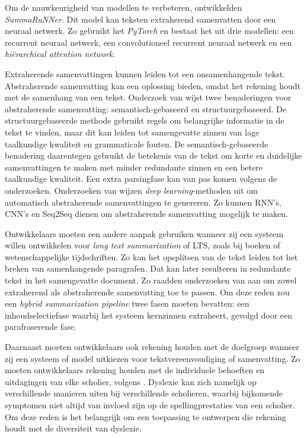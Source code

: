 \medspace

Om de nauwkeurigheid van modellen te verbeteren, ontwikkelden \textcite{Nallapati2017} \textit{SummaRuNNer}. Dit model kan teksten extraherend samenvatten door een neuraal netwerk. Zo gebruikt het \textit{PyTorch} en bestaat het uit drie modellen: een recurrent neuraal netwerk, een convolutioneel recurrent neuraal netwerk en een \textit{hiërarchical attention network}.

\medspace

Extraherende samenvattingen kunnen leiden tot een onsamenhangende tekst. Abstraherende samenvatting kan een oplossing bieden, omdat het rekening houdt met de samenhang van een tekst. Onderzoek van \textcite{Gupta2019} wijst twee benaderingen voor abstraherende samenvatting: semantisch-gebaseerd en structuurgebaseerd. De structuurgebaseerde methode gebruikt regels om belangrijke informatie in de tekst te vinden, maar dit kan leiden tot samengevatte zinnen van lage taalkundige kwaliteit en grammaticale fouten. De semantisch-gebaseerde benadering daarentegen gebruikt de betekenis van de tekst om korte en duidelijke samenvattingen te maken met minder redundante zinnen en een betere taalkundige kwaliteit. Een extra parsingfase kan van pas komen volgens de onderzoeken. Onderzoeken van \textcite{Suleiman2020, Cao2022} wijzen \textit{deep learning}-methoden uit om automatisch abstraherende samenvattingen te genereren. Zo kunnen RNN's, CNN's en Seq2Seq dienen om abstraherende samenvatting mogelijk te maken. 

\medspace

Ontwikkelaars moeten een andere aanpak gebruiken wanneer zij een systeem willen ontwikkelen voor \textit{long text summarization} of LTS, zoals bij boeken of wetenschappelijke tijdschriften. Zo kan het opsplitsen van de tekst leiden tot het breken van samenhangende paragrafen. Dat kan later resulteren in redundante tekst in het samengevatte document. Zo raadden onderzoeken van \textcite{Hsu2018, Huang2019} aan om zowel extraherend als abstraherende samenvatting toe te passen. Om deze reden zou een \textit{hybrid summarization pipeline} twee fasen moeten bevatten: een inhoudselectiefase waarbij het systeem kernzinnen extraheert, gevolgd door een parafraserende fase.

\medspace

Daarnaast moeten ontwikkelaars ook rekening houden met de doelgroep wanneer zij een systeem of model uitkiezen voor tekstvereenvoudiging of samenvatting. Zo moeten ontwikkelaars rekening houden met de individuele behoeften en uitdagingen van elke scholier, volgens \textcite{Gooding2022}. Dyslexie kan zich namelijk op verschillende manieren uiten bij verschillende scholieren, waarbij bijkomende symptomen niet altijd van invloed zijn op de spellingprestaties van een scholier. Om deze reden is het belangrijk om een toepassing te ontwerpen die rekening houdt met de diversiteit van dyslexie.

